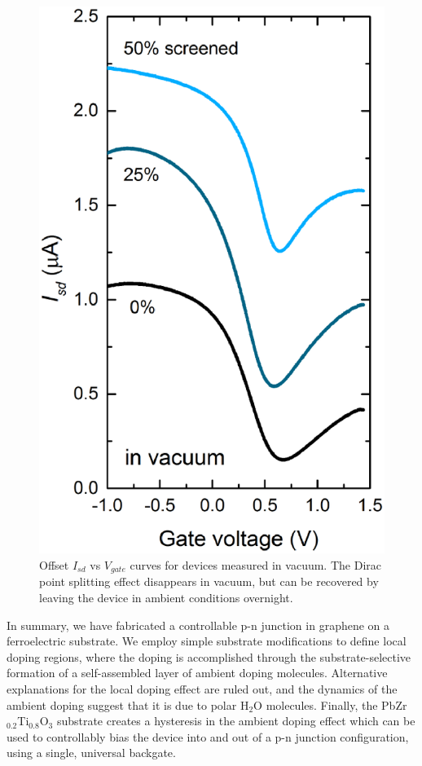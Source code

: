\documentclass[edeposit,fullpage,draftthesis]{uiucthesis2009}
\begin{document}
\begin{figure}
  \centering
  \includegraphics[width=.5\textwidth]{images/resultsanddiscussion/pztpaper/figure4}
  \caption[I-V curves for graphene-ferroelectric pn junction devices measured in vacuum]{
   Offset $I_{sd}$ vs $V_{gate}$ curves for devices measured in vacuum. The Dirac point splitting effect disappears in vacuum, but can be recovered by leaving the device in ambient conditions overnight.
  }
  \label{fig:PZTvacuum}
\end{figure}



In summary, we have fabricated a controllable p-n junction in graphene on a ferroelectric substrate. We employ simple substrate modifications to define local doping regions, where the doping is accomplished through the substrate-selective formation of a self-assembled layer of ambient doping molecules. Alternative explanations for the local doping effect are ruled out, and the dynamics of the ambient doping suggest that it is due to polar H$_2$O molecules. Finally, the PbZr$_{0.2}$Ti$_{0.8}$O$_3$ substrate creates a hysteresis in the ambient doping effect which can be used to controllably bias the device into and out of a p-n junction configuration, using a single, universal backgate.
\end{document}
